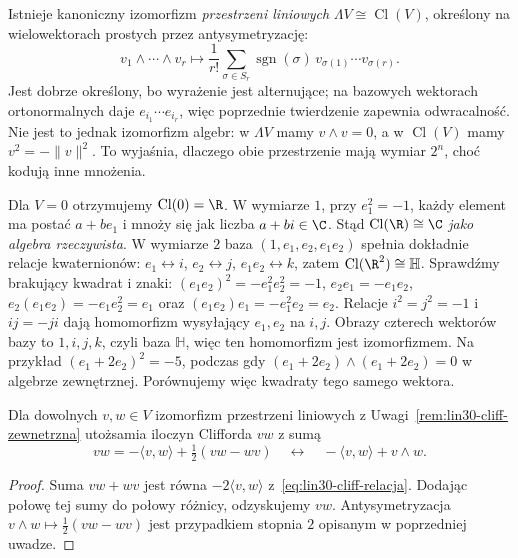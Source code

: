 \begin{uwaga}
\label{rem:lin30-cliff-zewnetrzna}
Istnieje kanoniczny izomorfizm \emph{przestrzeni liniowych}
$\Lambda V\cong\operatorname{Cl}(V)$, określony
na wielowektorach prostych przez antysymetryzację:
\[
v_1\wedge\cdots\wedge v_r
\longmapsto
\frac1{r!}\sum_{\sigma\in S_r}
\operatorname{sgn}(\sigma)\,
v_{\sigma(1)}\cdots v_{\sigma(r)}.
\]
Jest dobrze określony, bo wyrażenie jest alternujące;
na bazowych wektorach ortonormalnych daje
$e_{i_1}\cdots e_{i_r}$, więc poprzednie twierdzenie
zapewnia odwracalność. Nie jest to jednak izomorfizm
algebr: w $\Lambda V$ mamy $v\wedge v=0$,
a w $\operatorname{Cl}(V)$ mamy
$v^2=-\|v\|^2$. To wyjaśnia, dlaczego obie
przestrzenie mają wymiar $2^n$, choć kodują
inne mnożenia.
\end{uwaga}

\begin{przyklad}[Wymiary $0$, $1$ i $2$]
Dla $V=0$ otrzymujemy $\operatorname{Cl}(0)=\R$.
W wymiarze $1$, przy $e_1^2=-1$, każdy element
ma postać $a+be_1$ i mnoży się jak liczba
$a+bi\in\C$. Stąd $\operatorname{Cl}(\R)\cong\C$
\emph{jako algebra rzeczywista}.
W wymiarze $2$ baza $(1,e_1,e_2,e_1e_2)$
spełnia dokładnie relacje kwaternionów:
$e_1\leftrightarrow i$, $e_2\leftrightarrow j$,
$e_1e_2\leftrightarrow k$, zatem
$\operatorname{Cl}(\R^2)\cong\mathbb H$.
Sprawdźmy brakujący kwadrat i znaki:
$(e_1e_2)^2=-e_1^2e_2^2=-1$,
$e_2e_1=-e_1e_2$,
$e_2(e_1e_2)=-e_1e_2^2=e_1$ oraz
$(e_1e_2)e_1=-e_1^2e_2=e_2$.
Relacje $i^2=j^2=-1$ i $ij=-ji$ dają homomorfizm
wysyłający $e_1,e_2$ na $i,j$.
Obrazy czterech wektorów bazy to $1,i,j,k$, czyli baza
$\mathbb H$, więc ten homomorfizm jest izomorfizmem.
Na przykład $(e_1+2e_2)^2=-5$, podczas gdy
$(e_1+2e_2)\wedge(e_1+2e_2)=0$
w algebrze zewnętrznej. Porównujemy więc kwadraty tego samego wektora.
\end{przyklad}

\begin{stwierdzenie}
\label{prop:lin30-cliff-wedge}
Dla dowolnych $v,w\in V$ izomorfizm przestrzeni liniowych
z Uwagi~\ref{rem:lin30-cliff-zewnetrzna} utożsamia
iloczyn Clifforda $vw$ z sumą
\begin{equation}\label{eq:lin30-cliff-rozdzial}
 vw=-\langle v,w\rangle
       +\tfrac12(vw-wv)
 \quad\longleftrightarrow\quad
 -\langle v,w\rangle+v\wedge w.
\end{equation}
\end{stwierdzenie}
\begin{proof}
Suma $vw+wv$ jest równa
$-2\langle v,w\rangle$ z~\eqref{eq:lin30-cliff-relacja}.
Dodając połowę tej sumy do połowy różnicy,
odzyskujemy $vw$. Antysymetryzacja
$v\wedge w\mapsto\tfrac12(vw-wv)$
jest przypadkiem stopnia $2$ opisanym w
poprzedniej uwadze.
\end{proof}

